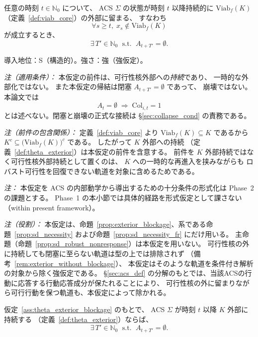 \begin{assumption}[可行性核外部持続と閉塞の有限時間接続]
\label{ass:theta_exterior_blockage}
任意の時刻 $t\in\mathbb{N}_0$ について、
ACS $\Sigma$ の状態が時刻 $t$ 以降持続的に
$\mathrm{Viab}_f(K)$（定義~\ref{def:viab_core}）の外部に留まる、
すなわち
\[
  \forall s\ge t,\;
  x_s\notin\mathrm{Viab}_f(K)
\]
が成立するとき、
\[
  \exists\,T'\in\mathbb{N}_0
  \;\text{ s.t. }\;
  A_{t+T'}=\emptyset.
\]

導入地位：S（構造的）。強さ：強（強仮定）。

\textit{注（適用条件）：}
本仮定の前件は、可行性核外部への\emph{持続}であり、
一時的な外部化ではない。
また本仮定の帰結は閉塞 $A_{t+T'}=\emptyset$ であって、
崩壊ではない。
本論文では
\[
  A_t=\emptyset
  \;\Longrightarrow\;
  \mathrm{Col}_{i,t}=1
\]
とは述べない。閉塞と崩壊の正式な接続は
\S\ref{sec:collapse_cond} の責務である。

\textit{注（前件の包含関係）：}
定義~\ref{def:viab_core} より
$\mathrm{Viab}_f(K)\subseteq K$ であるから
$K^c\subseteq\bigl(\mathrm{Viab}_f(K)\bigr)^c$ である。
したがって $K$ 外部への持続
（定義~\ref{def:theta_exterior}）は本仮定の前件を含意する。
前件を $K$ 外部持続ではなく可行性核外部持続として置くのは、
$K$ への一時的な再進入を挟みながらも
ロバスト可行性を回復できない軌道を対象に含めるためである。

\textit{注：}
本仮定を ACS の内部動学から導出するための十分条件の形式化は
Phase~2 の課題とする。
Phase~1 の本小節では具体的経路を形式仮定として課さない
（within present framework）。

\textit{注（役割）：}
本仮定は、命題~\ref{prop:exterior_blockage}、系である命題~\ref{prop:sd_necessity} および命題~\ref{prop:sd_necessity_fr} にだけ用いる。
主命題（命題~\ref{prop:sd_robust_nonresponse}）は本仮定を用いない。
可行性核の外に持続しても閉塞に至らない軌道は型の上では排除されず
（備考~\ref{rem:exterior_without_blockage}）、
本仮定はそのような軌道を条件付き解析の対象から除く強仮定である。
\S\ref{sec:acs_def} の分解のもとでは、当該ACSの行動に応答する行動応答成分が保たれることにより、
可行性核の外に留まりながら可行行動を保つ軌道も、本仮定によって除かれる。
\end{assumption}

\begin{proposition}[$K$ 外部持続と閉塞]
\label{prop:exterior_blockage}
仮定~\ref{ass:theta_exterior_blockage} のもとで、
ACS $\Sigma$ が時刻 $t$ 以降 $K$ 外部に持続する
（定義~\ref{def:theta_exterior}）ならば、
\[
  \exists\,T'\in\mathbb{N}_0
  \;\text{ s.t. }\;
  A_{t+T'}=\emptyset.
\]
\end{proposition}

